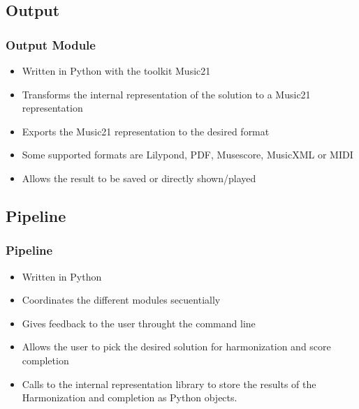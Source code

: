 \documentclass[english]{beamer}
\begin{document}
\subsection{Output}
		\begin{frame}
		\frametitle{Output Module}
			\begin{itemize}
				\item Written in Python with the toolkit Music21
				\item Transforms the internal representation of the solution to a Music21 representation
				\item Exports the Music21 representation to the desired format
				\item Some supported formats are Lilypond, PDF, Musescore, MusicXML or MIDI
				\item Allows the result to be saved or directly shown/played
			\end{itemize}
		\end{frame}
\subsection{Pipeline}
	\begin{frame}
	\frametitle{Pipeline}
		\begin{itemize}
			\item Written in Python
			\item Coordinates the different modules secuentially
			\item Gives feedback to the user throught the command line
			\item Allows the user to pick the desired solution for harmonization and score completion
			\item Calls to the internal representation library to store the results of the Harmonization and completion as Python objects.
		\end{itemize}
	\end{frame}
\end{document}
